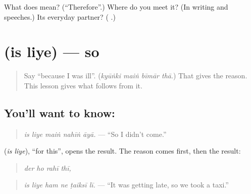 \begin{tcolorbox}[breakable,colback=teal!4,colframe=teal!35!black,title={Before you move on}]
What does \textbf{} mean? (\textquotedblleft{}Therefore\textquotedblright{}.) Where do you meet it? (In writing and speeches.) Its everyday partner? (\textbf{ }.)
\end{tcolorbox}
\section[\texorpdfstring{\ur{اس} \ur{لیے} (is liye)}{اس لیے (is liye)}]{  (is liye) — so}

\label{lesson:UR-C269-is-liye}



\begin{quote}
Say \textquotedblleft{}because I was ill\textquotedblright{}. (\emph{kyūṅki maiṅ bīmār thā}.) That gives the reason. This lesson gives what follows from it.
\end{quote}

\subsection*{You'll want to know:  }
\begin{quote}
\textbf{    }
\end{quote}

\begin{quote}
\emph{is liye maiṅ nahīṅ āyā.} — \textquotedblleft{}So I didn't come.\textquotedblright{}
\end{quote}

\textbf{ } (\emph{is liye}), \textquotedblleft{}for this\textquotedblright{}, opens the result. The reason comes first, then the result:

\begin{quote}
\textbf{   }
\end{quote}

\begin{quote}
\emph{der ho rahī thī,}
\end{quote}

\begin{quote}
\textbf{     }
\end{quote}

\begin{quote}
\emph{is liye ham ne ṭaiksī lī.} — \textquotedblleft{}It was getting late, so we took a taxi.\textquotedblright{}
\end{quote}

